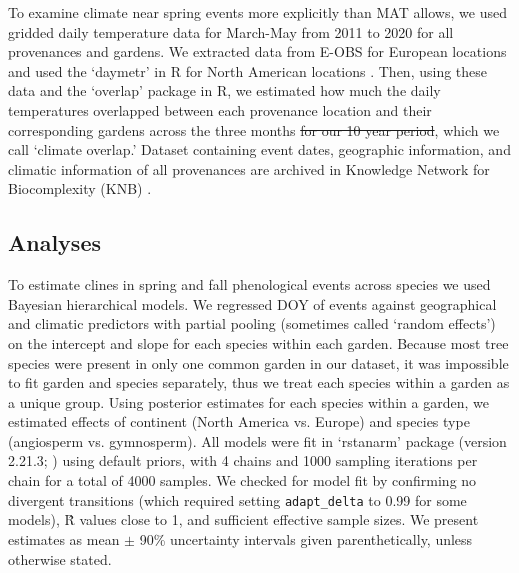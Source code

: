 \documentclass[12pt]{article}
\providecommand{\DIFaddtex}[1]{{\protect\color{blue}\uwave{#1}}} %
\providecommand{\DIFdeltex}[1]{{\protect\color{red}\sout{#1}}}                      %
\providecommand{\DIFaddbegin}{} %
\providecommand{\DIFaddend}{} %
\providecommand{\DIFdelbegin}{} %
\providecommand{\DIFdelend}{} %
\providecommand{\DIFadd}[1]{\texorpdfstring{\DIFaddtex{#1}}{#1}} %
\providecommand{\DIFdel}[1]{\texorpdfstring{\DIFdeltex{#1}}{}} %
\newcommand{\DIFscaledelfig}{0.5}
\newlength{\DIFdelgraphicswidth} %
\newlength{\DIFdelgraphicsheight} %
\newcommand{\DIFaddincludegraphics}[2][]{{\color{blue}\fbox{\DIFOincludegraphics[#1]{#2}}}} %
\newcommand{\DIFdelincludegraphics}[2][]{%
\sbox{\DIFdelgraphicsbox}{\DIFOincludegraphics[#1]{#2}}%
\settoboxwidth{\DIFdelgraphicswidth}{\DIFdelgraphicsbox} %
\settoboxtotalheight{\DIFdelgraphicsheight}{\DIFdelgraphicsbox} %
\scalebox{\DIFscaledelfig}{%
\parbox[b]{\DIFdelgraphicswidth}{\usebox{\DIFdelgraphicsbox}\\[-\baselineskip] \rule{\DIFdelgraphicswidth}{0em}}\llap{\resizebox{\DIFdelgraphicswidth}{\DIFdelgraphicsheight}{%
\setlength{\unitlength}{\DIFdelgraphicswidth}%
\begin{picture}(1,1)%
\thicklines\linethickness{2pt} %
{\color[rgb]{1,0,0}\put(0,0){\framebox(1,1){}}}%
{\color[rgb]{1,0,0}\put(0,0){\line( 1,1){1}}}%
{\color[rgb]{1,0,0}\put(0,1){\line(1,-1){1}}}%
\end{picture}%
}\hspace*{3pt}}} %
} %
\DeclareRobustCommand{\DIFaddbegin}{\DIFOaddbegin \let\includegraphics\DIFaddincludegraphics} %
\DeclareRobustCommand{\DIFaddend}{\DIFOaddend \let\includegraphics\DIFOincludegraphics} %
\DeclareRobustCommand{\DIFdelbegin}{\DIFOdelbegin \let\includegraphics\DIFdelincludegraphics} %
\DeclareRobustCommand{\DIFdelend}{\DIFOaddend \let\includegraphics\DIFOincludegraphics} %
\begin{document}
To examine climate near spring events more explicitly than MAT allows, we used gridded daily temperature data for March-May from 2011 to 2020 for all provenances and gardens. We extracted data from E-OBS for European locations and used the `daymetr' in R for North American locations \citep{cornes2018,hufkens2018}. Then, using these data and the `overlap' package in R, we estimated how much the daily temperatures overlapped between each provenance location and their corresponding gardens across the three months \DIFdelbegin \DIFdel{for our 10 year period}\DIFdelend \DIFaddbegin \DIFadd{from 2011 to 2020}\DIFaddend , which we call `climate overlap.' Dataset containing event dates, geographic information, and climatic information of all provenances are archived in  Knowledge Network for Biocomplexity (KNB) \citep{zeng23}.  %

\subsection{Analyses}
To estimate clines in spring and fall phenological events across species we used Bayesian hierarchical models. We regressed DOY of events against geographical and climatic predictors with partial pooling (sometimes called `random effects') on the intercept and slope for each species within each garden. Because most tree species were present in only one common garden in our dataset, it was impossible to fit garden and species separately, thus we treat each species within a garden as a unique group. Using posterior estimates for each species within a garden, we estimated effects of continent (North America vs. Europe) and species type (angiosperm vs. gymnosperm). All models were fit in `rstanarm' package (version 2.21.3; \citealp{brilleman2018}) using default priors, with 4 chains and 1000 sampling iterations per chain for a total of 4000 samples. We checked for model fit by confirming no divergent transitions (which required setting \texttt{adapt\_delta} to 0.99 for some models), \^{R} values close to 1, and sufficient effective sample sizes. We present estimates as mean $\pm$ 90\% uncertainty intervals given parenthetically, unless otherwise stated. 
\end{document}
